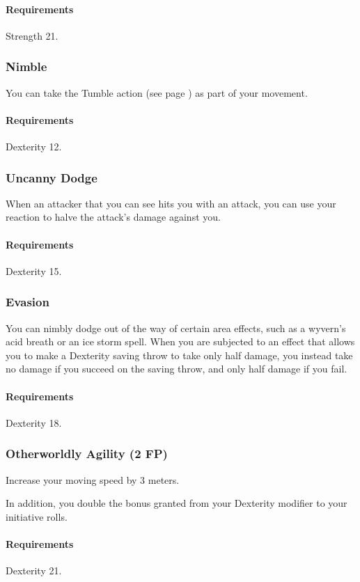     \paragraph{Requirements} Strength 21.
\subsubsection{Nimble} \label{feat::nimble}
    You can take the Tumble action (see page \pageref{act::tumble}) as part of your movement.
    \paragraph{Requirements} Dexterity 12.
\subsubsection{Uncanny Dodge} \label{feat::uncannydodge}
    When an attacker that you can see hits you with an attack, you can use your reaction to halve the attack's damage against you.
    \paragraph{Requirements} Dexterity 15.
\subsubsection{Evasion} \label{feat::evasion}
    You can nimbly dodge out of the way of certain area effects, such as a wyvern's acid breath or an ice storm spell.
    When you are subjected to an effect that allows you to make a Dexterity saving throw to take only half damage, you instead take no damage if you succeed on the saving throw, and only half damage if you fail.
    \paragraph{Requirements} Dexterity 18.
\subsubsection{Otherworldly Agility (2 FP)} \label{feat::otherwordlyagility}
    Increase your moving speed by 3 meters.

    In addition, you double the bonus granted from your Dexterity modifier to your initiative rolls.
    \paragraph{Requirements} Dexterity 21.
